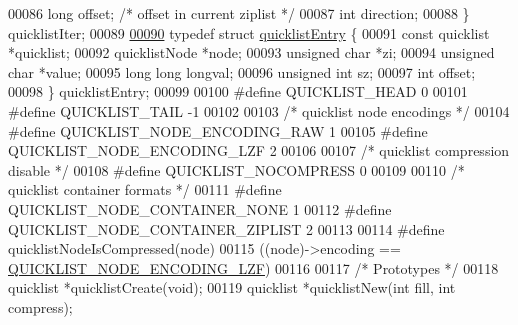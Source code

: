 \begin{DoxyCode}
00086     \textcolor{keywordtype}{long} offset; \textcolor{comment}{/* offset in current ziplist */}
00087     \textcolor{keywordtype}{int} direction;
00088 \} quicklistIter;
00089 
\hyperlink{structquicklistEntry}{00090} \textcolor{keyword}{typedef} \textcolor{keyword}{struct} \hyperlink{structquicklistEntry}{quicklistEntry} \{
00091     \textcolor{keyword}{const} quicklist *quicklist;
00092     quicklistNode *node;
00093     \textcolor{keywordtype}{unsigned} \textcolor{keywordtype}{char} *zi;
00094     \textcolor{keywordtype}{unsigned} \textcolor{keywordtype}{char} *value;
00095     \textcolor{keywordtype}{long} \textcolor{keywordtype}{long} longval;
00096     \textcolor{keywordtype}{unsigned} \textcolor{keywordtype}{int} sz;
00097     \textcolor{keywordtype}{int} offset;
00098 \} quicklistEntry;
00099 
00100 \textcolor{preprocessor}{#}\textcolor{preprocessor}{define} \textcolor{preprocessor}{QUICKLIST\_HEAD} 0
00101 \textcolor{preprocessor}{#}\textcolor{preprocessor}{define} \textcolor{preprocessor}{QUICKLIST\_TAIL} \textcolor{preprocessor}{-}1
00102 
00103 \textcolor{comment}{/* quicklist node encodings */}
00104 \textcolor{preprocessor}{#}\textcolor{preprocessor}{define} \textcolor{preprocessor}{QUICKLIST\_NODE\_ENCODING\_RAW} 1
00105 \textcolor{preprocessor}{#}\textcolor{preprocessor}{define} \textcolor{preprocessor}{QUICKLIST\_NODE\_ENCODING\_LZF} 2
00106 
00107 \textcolor{comment}{/* quicklist compression disable */}
00108 \textcolor{preprocessor}{#}\textcolor{preprocessor}{define} \textcolor{preprocessor}{QUICKLIST\_NOCOMPRESS} 0
00109 
00110 \textcolor{comment}{/* quicklist container formats */}
00111 \textcolor{preprocessor}{#}\textcolor{preprocessor}{define} \textcolor{preprocessor}{QUICKLIST\_NODE\_CONTAINER\_NONE} 1
00112 \textcolor{preprocessor}{#}\textcolor{preprocessor}{define} \textcolor{preprocessor}{QUICKLIST\_NODE\_CONTAINER\_ZIPLIST} 2
00113 
00114 \textcolor{preprocessor}{#}\textcolor{preprocessor}{define} \textcolor{preprocessor}{quicklistNodeIsCompressed}\textcolor{preprocessor}{(}\textcolor{preprocessor}{node}\textcolor{preprocessor}{)}
00115     \textcolor{preprocessor}{(}\textcolor{preprocessor}{(}\textcolor{preprocessor}{node}\textcolor{preprocessor}{)}\textcolor{preprocessor}{->}\textcolor{preprocessor}{encoding} \textcolor{preprocessor}{==} \hyperlink{quicklist_8h_a6ce238912d4049e020b686def25c9566}{QUICKLIST\_NODE\_ENCODING\_LZF}\textcolor{preprocessor}{)}
00116 
00117 \textcolor{comment}{/* Prototypes */}
00118 quicklist *quicklistCreate(\textcolor{keywordtype}{void});
00119 quicklist *quicklistNew(\textcolor{keywordtype}{int} fill, \textcolor{keywordtype}{int} compress);

\end{DoxyCode}
